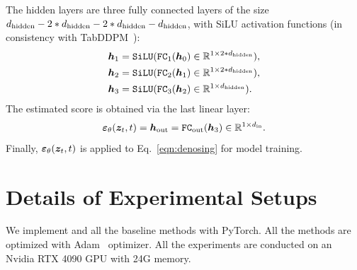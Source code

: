 The hidden layers are three fully connected layers of the size $d_{\rm hidden} - 2*d_{\rm hidden} - 2*d_{\rm hidden} - d_{\rm hidden}$, with SiLU activation functions (in consistency with TabDDPM~\citep{tabddpm}): 
\begin{equation}
\begin{split}
    {\bm{h}}_1 & = \texttt{SiLU}(\texttt{FC}_{1}({\bm{h}}_0) \in {\mathbb{R}}^{1\times 2*d_{\rm hidden}}), \\
    {\bm{h}}_2 & = \texttt{SiLU}(\texttt{FC}_{2}({\bm{h}}_1) \in {\mathbb{R}}^{1\times 2*d_{\rm hidden}}), \\
    {\bm{h}}_3 & = \texttt{SiLU}(\texttt{FC}_{3}({\bm{h}}_2) \in {\mathbb{R}}^{1\times d_{\rm hidden}}). \\
\end{split}
\end{equation}
The estimated score is obtained via the last linear layer:
\begin{equation}
      \bm{\varepsilon}_{\theta}({\bm{z}}_t, t) =  {\bm{h}}_{\rm out} = \texttt{FC}_{\rm out}({\bm{h}}_3) \in {\mathbb{R}}^{1\times d_{\rm in}}.
\end{equation}
Finally, $\bm{\varepsilon}_{\theta}({\bm{z}}_t, t)$ is applied to Eq.~\ref{eqn:denosing} for model training.

\section{Details of Experimental Setups}\label{appendix:experiments}
We implement \modelname and all the baseline methods with PyTorch. All the methods are optimized with Adam~\citep{adam} optimizer. All the experiments are conducted on an Nvidia RTX 4090 GPU with 24G memory.

